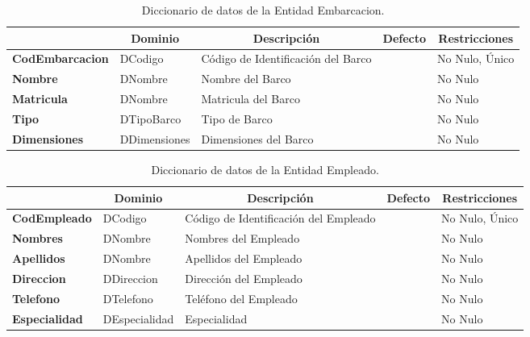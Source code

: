 \begin{table}[H]
\centering
\caption{Diccionario de datos de la Entidad Embarcacion.}
\label{tab-Dicc-32}
\begin{tabular}{>{\bfseries}m{4.0cm}>{}m{3.0cm}>{}m{6.0cm}>{}m{5.0cm}>{}m{2.0cm}}
\toprule
\multicolumn{1}{c}{\textbf{Atributo}} & \multicolumn{1}{c}{\textbf{Dominio}} & \multicolumn{1}{c}{\textbf{Descripción}} & \multicolumn{1}{c}{\textbf{Defecto}} & \multicolumn{1}{c}{\textbf{Restricciones}} \\ \midrule
CodEmbarcacion	&	DCodigo	&	Código de Identificación del Barco	&		&	No Nulo, Único\\
Nombre	&	DNombre	&	Nombre del Barco	&		&	No Nulo\\
Matricula	&	DNombre	&	Matricula del Barco	&		&	No Nulo\\
Tipo	&	DTipoBarco	&	Tipo de Barco	&		&	No Nulo\\
Dimensiones	&	DDimensiones	&	Dimensiones del Barco	&		&	No Nulo\\
\bottomrule
\end{tabular}
\end{table}

\begin{table}[H]
\centering
\caption{Diccionario de datos de la Entidad Empleado.}
\label{tab-Dicc-33}
\begin{tabular}{>{\bfseries}m{4.0cm}>{}m{3.0cm}>{}m{6.0cm}>{}m{5.0cm}>{}m{2.0cm}}
\toprule
\multicolumn{1}{c}{\textbf{Atributo}} & \multicolumn{1}{c}{\textbf{Dominio}} & \multicolumn{1}{c}{\textbf{Descripción}} & \multicolumn{1}{c}{\textbf{Defecto}} & \multicolumn{1}{c}{\textbf{Restricciones}} \\ \midrule
CodEmpleado	&	DCodigo	&	Código de Identificación del Empleado	&		&	No Nulo, Único\\
Nombres	&	DNombre	&	Nombres del Empleado	&		&	No Nulo\\
Apellidos	&	DNombre	&	Apellidos del Empleado	&		&	No Nulo\\
Direccion	&	DDireccion	&	Dirección del Empleado	&		&	No Nulo\\
Telefono	&	DTelefono	&	Teléfono del Empleado	&		&	No Nulo\\
Especialidad	& DEspecialidad		&	Especialidad	&		&	No Nulo\\
\bottomrule
\end{tabular}
\end{table}

